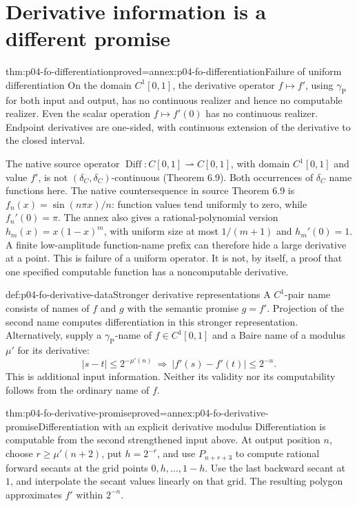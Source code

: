 \section{Derivative information is a different promise}
\label{sec:p04-fo-differentiation}

\begin{hbtheorem}{thm:p04-fo-differentiation}{proved=annex:p04-fo-differentiation}{Failure of uniform differentiation}
On the domain \(C^1[0,1]\), the derivative operator
\(f\mapsto f'\), using \(\gamma_{\mathrm P}\) for both
input and output, has no continuous realizer and hence
no computable realizer. Even the scalar operation
\(f\mapsto f'(0)\) has no continuous realizer.
Endpoint derivatives are one-sided, with continuous extension
of the derivative to the closed interval.
\end{hbtheorem}

The native source operator
\(\operatorname{Diff}:C[0,1]\rightharpoonup C[0,1]\),
with domain \(C^1[0,1]\) and value \(f'\), is not
\((\delta_C,\delta_C)\)-continuous (Theorem 6.9).
Both occurrences of \(\delta_C\) name functions here.
The native countersequence in source Theorem 6.9 is
\(f_n(x)=\sin(n\pi x)/n\): function values tend uniformly
to zero, while \(f_n'(0)=\pi\).
The annex also gives a rational-polynomial version
\(h_m(x)=x(1-x)^m\), with uniform size at most
\(1/(m+1)\) and \(h_m'(0)=1\).
A finite low-amplitude function-name prefix can therefore
hide a large derivative at a point.
This is failure of a uniform operator. It is not, by itself,
a proof that one specified computable function has a
noncomputable derivative.

\begin{hbdefinition}{def:p04-fo-derivative-data}{Stronger derivative representations}
A \(C^1\)-pair name consists of names of \(f\) and \(g\)
with the semantic promise \(g=f'\).
Projection of the second name computes differentiation in
this stronger representation.
Alternatively, supply a \(\gamma_{\mathrm P}\)-name of
\(f\in C^1[0,1]\) and a Baire name of a modulus \(\mu'\)
for its derivative:
\[
 |s-t|\leq2^{-\mu'(n)}
 \ \Longrightarrow\ |f'(s)-f'(t)|\leq2^{-n}.
\]
This is additional input information. Neither its validity
nor its computability follows from the ordinary name of \(f\).
\end{hbdefinition}

\begin{hbtheorem}{thm:p04-fo-derivative-promise}{proved=annex:p04-fo-derivative-promise}{Differentiation with an explicit derivative modulus}
Differentiation is computable from the second strengthened
input above. At output position \(n\), choose
\(r\geq\mu'(n+2)\), put \(h=2^{-r}\), and use
\(P_{n+r+3}\) to compute rational forward secants at
the grid points \(0,h,\ldots,1-h\).
Use the last backward secant at \(1\), and interpolate the
secant values linearly on that grid.
The resulting polygon approximates \(f'\) within \(2^{-n}\).
\end{hbtheorem}

